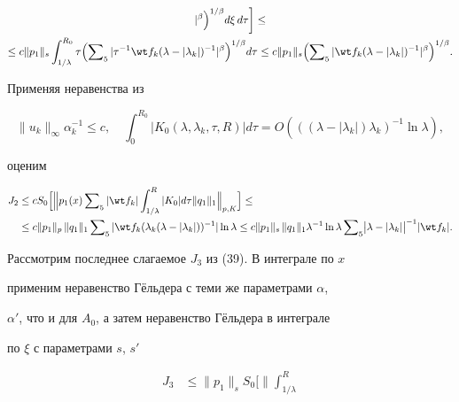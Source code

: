 {\begin{multline*}
|^\beta\Bigr)^{1/\beta}d\xi\,d\tau\biggr] \le \\


\le c\|p_1\|_s\int^{R_0}_{1/\lambda}\tau\Bigl(\sumn_5


|\tau^{-1}\wt f_k(\lambda-|\lambda_k|)^{-1}|^\beta


\Bigr)^{1/\beta}d\tau\le c\|p_1\|_s


\Bigl(\sumn_5|\wt f_k(\lambda-|\lambda_k|)^{-1}|^\beta


\Bigr)^{1/\beta}.


\end{multline*}





Применяя неравенства из \cite{12}


$$


\|u_k\|_\infty\alpha^{-1}_k\le c,\quad


\int^{R_0}_0|K_0(\lambda,\lambda_k,\tau,R)|d\tau=


O(((\lambda-|\lambda_k|)\lambda_k)^{-1}\ln\lambda),


$$


оценим


\begin{align*}


J_2&\le c S_0\Bigl[\Bigl\|p_1(x)\sumn_5|\wt f_k|


\int^R_{1/\lambda}|K_0|d\tau\|q_1\|_1\Bigr\|_{p,K}\Bigr]\le\\


&\le c\|p_1\|_p\,\|q_1\|_1\sumn_5|\wt f_k(\lambda_k


(\lambda-|\lambda_k|))^{-1}|\ln\lambda\le


c\|p_1\|_s\,\|q_1\|_1\lambda^{-1}\ln\lambda\sumn_5


\bigl|\lambda-|\lambda_k|\bigr|^{-1}|\wt f_k|.


\end{align*}





Рассмотрим последнее слагаемое $J_3$ из (39). В интеграле по $x$


применим неравенство Г\"ельдера с теми же параметрами $\alpha$,


$\alpha'$, что и для $A_0$, а затем неравенство Г\"ельдера в интеграле


по $\xi$ с параметрами $s$, $s'$


\begin{align*}


J_3&\le\|p_1\|_s S_0\biggl[\biggl\|\int^R_{1/\lambda}



\end{align*}}
